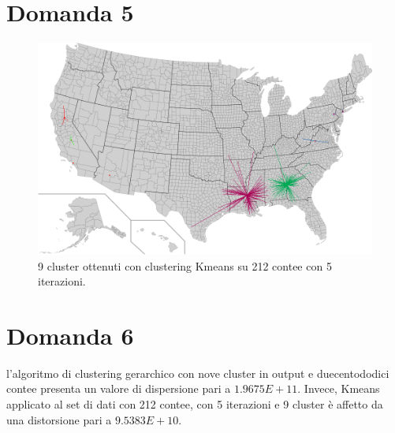 \documentclass{article}
\begin{document}
\section*{Domanda 5}
\begin{center}
	\begin{figure}[H]
		\hspace*{1.5cm}\includegraphics[width=0.8\linewidth, valign=t]{figures/Domanda5}
		\caption*{9 cluster ottenuti con clustering Kmeans su 212 contee con 5 iterazioni.}
	\end{figure}
\end{center}
\section*{Domanda 6}
l'algoritmo di clustering gerarchico con nove cluster in output e duecentododici contee presenta un valore di dispersione pari a $1.9675E+11$.
Invece, Kmeans applicato al set di dati con 212 contee, con 5 iterazioni e 9 cluster è affetto da una distorsione pari a $9.5383E+10$.
\end{document}
